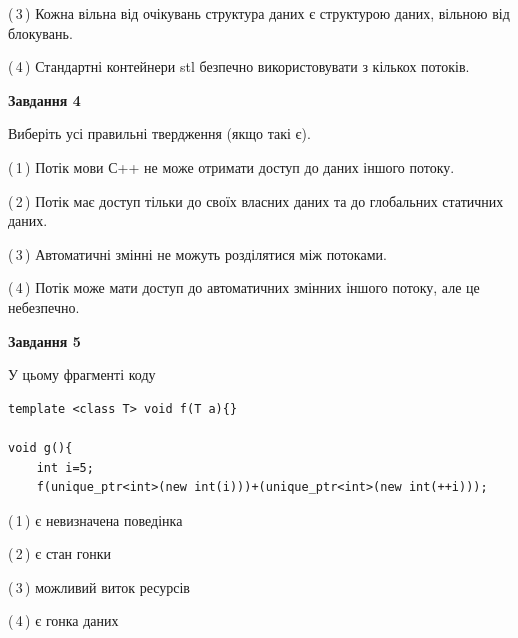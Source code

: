 \documentclass[12pt, ukrainian]{article}
\begin{document}
\begin {large}
{(\,3\,) Кожна вільна від очікувань структура даних є структурою даних, вільною від блокувань.%

(\,4\,) Стандартні контейнери stl безпечно використовувати з кількох потоків.%



\begin{center}
\textbf{Завдання 4}
\end{center}
Виберіть усі правильні твердження (якщо такі є).\par
\vspace{2mm}

(\,1\,) Потік мови С++ не може отримати доступ до даних іншого потоку.%

(\,2\,) Потік має доступ тільки до своїх власних даних та до глобальних статичних даних.%

(\,3\,) Автоматичні змінні не можуть розділятися між потоками.%

(\,4\,) Потік може мати доступ до автоматичних змінних іншого потоку, але це небезпечно.%



\begin{center}
\textbf{Завдання 5}
\end{center}
У цьому фрагменті коду
\begin{verbatim}
template <class T> void f(T a){}

void g(){
    int i=5;
    f(unique_ptr<int>(new int(i)))+(unique_ptr<int>(new int(++i)));
\end{verbatim}
(\,1\,) є невизначена поведінка%

(\,2\,) є стан гонки%

(\,3\,) можливий виток ресурсів%

(\,4\,) є гонка даних%


}
\end {large}
\end{document}
